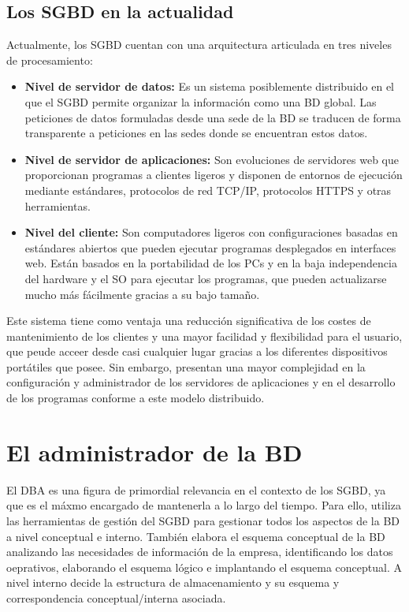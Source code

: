 \subsection{Los SGBD en la actualidad}

Actualmente, los SGBD cuentan con una arquitectura articulada en tres niveles de procesamiento:

\begin{itemize}
	\item\textbf{Nivel de servidor de datos:} Es un sistema posiblemente distribuido en el que el SGBD permite organizar la información como una BD global. Las peticiones de datos formuladas desde una sede de la BD se traducen de forma transparente a peticiones en las sedes donde se encuentran estos datos.
	\item\textbf{Nivel de servidor de aplicaciones:} Son evoluciones de servidores web que proporcionan programas a clientes ligeros y disponen de entornos de ejecución mediante estándares, protocolos de red TCP/IP, protocolos HTTPS y otras herramientas.
	\item\textbf{Nivel del cliente:} Son computadores ligeros con configuraciones basadas en estándares abiertos que pueden ejecutar programas desplegados en interfaces web. Están basados en la portabilidad de los PCs y en la baja independencia del hardware y el SO para ejecutar los programas, que pueden actualizarse mucho más fácilmente gracias a su bajo tamaño.
\end{itemize}

Este sistema tiene como ventaja una reducción significativa de los costes de mantenimiento de los clientes y una mayor facilidad y flexibilidad para el usuario, que peude acceer desde casi cualquier lugar gracias a los diferentes dispositivos portátiles que posee.
Sin embargo, presentan una mayor complejidad en la configuración y administrador de los servidores de aplicaciones y en el desarrollo de los programas conforme a este modelo distribuido.

\section{El administrador de la BD}

El DBA es una figura de primordial relevancia en el contexto de los SGBD, ya que es el máxmo encargado de mantenerla a lo largo del tiempo.
Para ello, utiliza las herramientas de gestión del SGBD para gestionar todos los aspectos de la BD a nivel conceptual e interno.
También elabora el esquema conceptual de la BD analizando las necesidades de información de la empresa, identificando los datos oeprativos, elaborando el esquema lógico e implantando el esquema conceptual.
A nivel interno decide la estructura de almacenamiento y su esquema y correspondencia conceptual/interna asociada.

